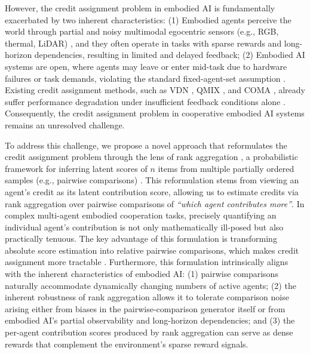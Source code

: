 \documentclass[11pt]{article}
\begin{document}
However, the credit assignment problem in embodied AI is fundamentally exacerbated by two inherent characteristics: (1) Embodied agents perceive the world through partial and noisy multimodal egocentric sensors (e.g., RGB, thermal, LiDAR) \cite{feng2025embodied}, and they often operate in tasks with sparse rewards and long-horizon dependencies, resulting in limited and delayed feedback; (2) Embodied AI systems are open, where agents may leave or enter mid-task due to hardware failures or task demands, violating the standard fixed-agent-set assumption \cite{tang2023roma, abadi2025challenges}. Existing credit assignment methods, such as VDN \cite{sunehag2017value}, QMIX \cite{rashid2020monotonic}, and COMA \cite{foerster2017counterfactual}, already suffer performance degradation under insufficient feedback conditions alone \cite{papoudakis2020benchmarking}. Consequently, the credit assignment problem in cooperative embodied AI systems remains an unresolved challenge.



%



%

%

%

To address this challenge, we propose a novel approach that reformulates the credit assignment problem through the lens of rank aggregation \cite{debreu1960individual}, a probabilistic framework for inferring latent scores of $n$ items from multiple partially ordered samples (e.g., pairwise comparisons) \cite{ma2022tale}. This reformulation stems from viewing an agent’s credit as its latent contribution score, allowing us to estimate credits via rank aggregation over pairwise comparisons of \textit{“which agent contributes more”}. In complex multi-agent embodied cooperation tasks, precisely quantifying an individual agent's contribution is not only mathematically ill-posed \cite{bakushinsky2012ill} but also practically tenuous. The key advantage of this formulation is transforming absolute score estimation into relative pairwise comparisons, which makes credit assignment more tractable \cite{christiano2017deep}. Furthermore, this formulation intrinsically aligns with the inherent characteristics of embodied AI: (1) pairwise comparisons naturally accommodate dynamically changing numbers of active agents; (2) the inherent robustness of rank aggregation allows it to tolerate comparison noise arising either from biases in the pairwise-comparison generator itself or from embodied AI’s partial observability and long-horizon dependencies; and (3) the per-agent contribution scores produced by rank aggregation can serve as dense rewards that complement the environment’s sparse reward signals.
\end{document}
